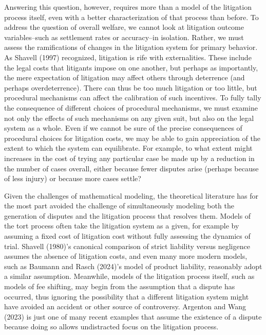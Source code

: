 \documentclass{article}
\begin{document}
Answering this question, however, requires more than a model of the litigation process itself, even with a better characterization of that process than before. To address the question of overall welfare, we cannot look at litigation outcome variables--such as settlement rates or accuracy--in isolation. Rather, we must assess the ramifications of changes in the litigation system for primary behavior. As Shavell (1997) recognized, litigation is rife with externalities. These include the legal costs that litigants impose on one another, but perhaps as importantly, the mere expectation of litigation may affect others through deterrence (and perhaps overdeterrence). There can thus be too much litigation or too little, but procedural mechanisms can affect the calibration of such incentives. To fully tally the consequence of different choices of procedural mechanisms, we must examine not only the effects of such mechanisms on any given suit, but also on the legal system as a whole. Even if we cannot be sure of the precise consequences of procedural choices for litigation costs, we may be able to gain appreciation of the extent to which the system can equilibrate. For example, to what extent might increases in the cost of trying any particular case be made up by a reduction in the number of cases overall, either because fewer disputes arise (perhaps because of less injury) or because more cases settle? 

Given the challenges of mathematical modeling, the theoretical literature has for the most part avoided the challenge of simultaneously modeling both the generation of disputes and the litigation process that resolves them. Models of the tort process often take the litigation system as a given, for example by assuming a fixed cost of litigation cost without fully assessing the dynamics of trial. Shavell (1980)'s canonical comparison of strict liability versus negligence assumes the absence of litigation costs, and even many more modern models, such as Baumann and Rasch (2024)'s model of product liability, reasonably adopt a similar assumption. Meanwhile, models of the litigation process itself, such as models of fee shifting, may begin from the assumption that a dispute has occurred, thus ignoring the possibility that a different litigation system might have avoided an accident or other source of controversy. Argenton and Wang (2023) is just one of many recent examples that assume the existence of a dispute because doing so allows undistracted focus on the litigation process.
\end{document}
